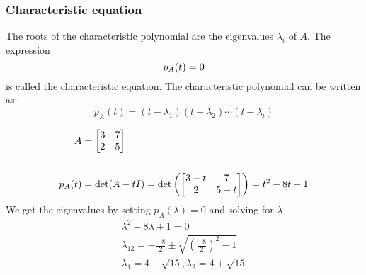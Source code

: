 \subsubsection{Characteristic equation}
The roots of the characteristic polynomial are the eigenvalues \(\lambda_i \) of \(A\). The expression
\begin{equation}
    p_A(t) = 0\\
\end{equation}
is called the characteristic equation. The characteristic polynomial can be written as:
\begin{equation}
    p_A(t) = (t - \lambda_1)(t - \lambda_2) \cdots (t - \lambda_i)
\end{equation}
\begin{example}\label{eigenexampld}
    \begin{align*}
        A      & = \begin{bmatrix}
            3 & 7 \\ 2 & 5
        \end{bmatrix}                                                 \\                                                                                                                                                  \\
        p_A(t) & = \det(A - t I)  = \det \left( \begin{bmatrix}
                3 - t & 7 \\2  & 5 - t
            \end{bmatrix} \right) =  t^2 - 8 t + 1 \\
    \end{align*}
    We get the eigenvalues by setting \(p_A(\lambda) = 0\) and solving for \( \lambda \)
    \begin{align*}
        \lambda^2 - 8 \lambda + 1 = 0                                           \\
        \lambda_{12} = -\frac{-8}{2} \pm \sqrt{\left( \frac{-8}{2}\right)^2 -1} \\
        \lambda_1 = 4 - \sqrt{15},  \lambda_2 = 4 + \sqrt{15}                   \\
    \end{align*}
\end{example}
